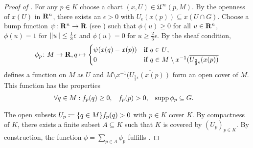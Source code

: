 \begin{proof}[Proof of ]
  For any $p \in K$ choose a chart $(x, U) \in \mathfrak U^\infty(p, M)$. 
  By the openness of $x(U)$ in $\mathbf{R}^n$, there exists an $\epsilon > 0$ with
  $U_\epsilon(x(p)) \subseteq x(U \cap G)$. Choose a bump function $\psi\colon \mathbf{R}^n \to
  \mathbf{R}$ (see ) such that $\phi(u) \ge 0$ for all
  $u \in \mathbf{R}^n$, $\phi(u) = 1$ for
  $\lVert u\rVert \leq \frac 1 3 \epsilon$ and $\phi(u) = 0$ for $u \ge \frac 2 3 \epsilon$.
  By the sheaf condition, 
  \[
    \phi_p\colon M \to \mathbf{R}, q \mapsto \begin{cases}
      \psi(x(q) - x(p)) & \text{if $q \in U$}, \\
      0 & \text{if $q \in M \setminus x^{-1}(\overline{U_{\frac 2 3 \epsilon}(x(p))}$}
    \end{cases}
  \]
  defines a function on $M$ as $U$ and $M \setminus x^{-1}(\overline{U_{\frac 2 3 \epsilon}(x(p))}$
  form an open cover of $M$. This function has the properties
  \begin{align*}
    \forall q \in M: f_p(q) & \ge 0, &
    f_p(p) & > 0, &
    \operatorname{supp} \phi_p & \subseteq G.
  \end{align*}
  
  The open subsets $U_p \coloneqq \lbrace q \in M\rbrace{f_p(q) > 0}$ with $p \in K$ cover $K$. By
  compactness of $K$, there exists a finite subset $A \subseteq K$ such that
  $K$ is covered by $(U_p)_{p \in K}$. By construction, the function
  $\phi = \sum_{p \in A} \phi_p$
  fulfills .
\end{proof}

